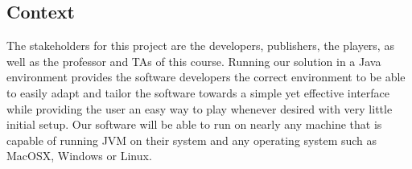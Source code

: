 \documentclass{article}
\begin{document}
\subsection*{Context}
    The stakeholders for this project are the developers, publishers, the players, as well as the professor and TAs of this course. Running our solution in a Java environment provides the software developers the correct environment to be able to easily adapt and tailor the software towards a simple yet effective interface while providing the user an easy way to play whenever desired with very little initial setup. Our software will be able to run on nearly any machine that is capable of running JVM on their system and any operating system such as MacOSX, Windows or Linux.
\end{document}
